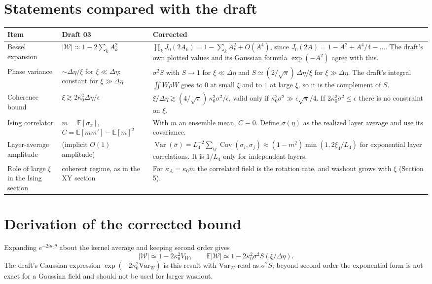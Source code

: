 \documentclass[11pt]{article}
\theoremstyle{remark}
\newcommand{\Wrec}{\Delta\eta}
\newcommand{\E}{\mathbb{E}}
\begin{document}
\section{Statements compared with the draft}

\begin{table}[h]
\centering\small
\renewcommand{\arraystretch}{1.3}
\begin{tabular}{p{3.0cm}p{5.6cm}p{6.2cm}}
\toprule
Item & Draft 03 & Corrected \\
\midrule
Bessel expansion & $|\mathcal W|\approx 1-2\sum_k A_k^2$ & $\prod_k J_0(2A_k)=1-\sum_k A_k^2+O(A^4)$, since $J_0(2A)=1-A^2+A^4/4-\dots$. The draft's own plotted values and its Gaussian formula $\exp(-A^2)$ agree with this. \\
Phase variance & $\sim\Wrec/\xi$ for $\xi\ll\Wrec$; constant for $\xi\gg\Wrec$ & $\sigma^2 S$ with $S\to1$ for $\xi\ll\Wrec$ and $S\simeq(2/\sqrt\pi)\,\Wrec/\xi$ for $\xi\gg\Wrec$. The draft's integral $\iint W\rho W$ goes to $0$ at small $\xi$ and to $1$ at large $\xi$, so it is the complement of $S$. \\
Coherence bound & $\xi\gtrsim 2\kappa_0^2\Wrec/\epsilon$ & $\xi/\Wrec\gtrsim(4/\sqrt\pi)\,\kappa_0^2\sigma^2/\epsilon$, valid only if $\kappa_0^2\sigma^2\gg\epsilon\sqrt\pi/4$. If $2\kappa_0^2\sigma^2\le\epsilon$ there is no constraint on $\xi$. \\
Ising correlator & $m=\E[\sigma_x]$, $C=\E[mm']-\E[m]^2$ & With $m$ an ensemble mean, $C\equiv0$. Define $\bar\sigma(\eta)$ as the realized layer average and use its covariance. \\
Layer-average amplitude & (implicit $O(1)$ amplitude) & $\operatorname{Var}(\bar\sigma)=L_4^{-2}\sum_{ij}\operatorname{Cov}(\sigma_i,\sigma_j)\approx(1-m^2)\min(1,2\xi_4/L_4)$ for exponential layer correlations. It is $1/L_4$ only for independent layers. \\
Role of large $\xi$ in the Ising section & coherent regime, as in the XY section & For $\kappa_A=\kappa_0 m$ the correlated field is the rotation rate, and washout grows with $\xi$ (Section 5). \\
\bottomrule
\end{tabular}
\end{table}

\section{Derivation of the corrected bound}

Expanding $e^{-2i\kappa_0\theta}$ about the kernel average and keeping second order gives
\[
|\mathcal W|\simeq 1-2\kappa_0^2V_W,
\qquad
\E|\mathcal W|\simeq1-2\kappa_0^2\sigma^2S(\xi/\Wrec).
\]
The draft's Gaussian expression $\exp(-2\kappa_0^2\mathrm{Var}_W)$ is this result with $\mathrm{Var}_W$ read as $\sigma^2S$; beyond second order the exponential form is not exact for a Gaussian field and should not be used for larger washout.
\end{document}
